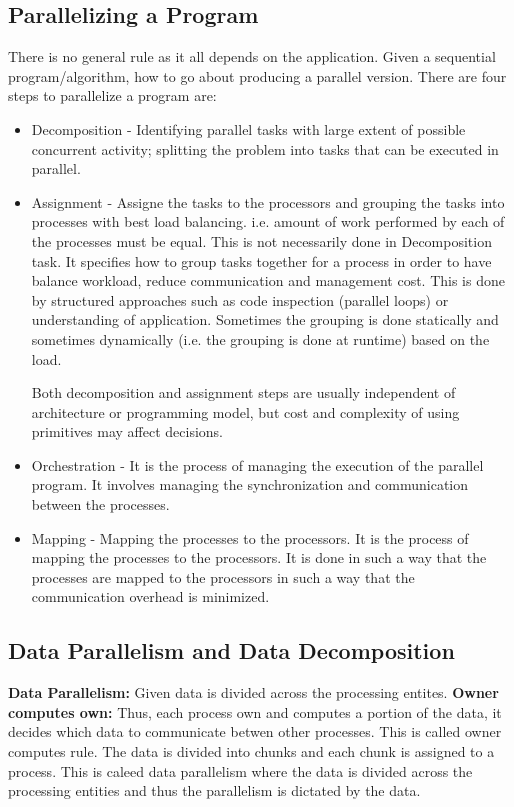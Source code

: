 \documentclass[12pt]{article}
\begin{document}
\subsection{Parallelizing a Program}
There is no general rule as it all depends on the application. Given a sequential program/algorithm, how to go about producing a parallel version. There are four steps to parallelize a program are:
\begin{itemize}
    \item Decomposition - Identifying parallel tasks with large extent of possible concurrent activity; splitting the problem into tasks that can be executed in parallel.
    \item Assignment - Assigne the tasks to the processors and grouping the tasks into processes with best load balancing. i.e. amount of work performed by each of the processes must be equal.
    This is not necessarily done in Decomposition task. It specifies how to group tasks together for a process in order to have balance workload, reduce communication and management cost.
    This is done by structured approaches such as code inspection (parallel loops) or understanding of application. Sometimes the grouping is done statically and sometimes dynamically (i.e. the grouping is done at runtime) based on the load.

    Both decomposition and assignment steps are usually independent of architecture or programming model, but cost and complexity of using primitives may affect decisions.
    \item Orchestration - It is the process of managing the execution of the parallel program. It involves managing the synchronization and communication between the processes. 
    \item Mapping - Mapping the processes to the processors. It is the process of mapping the processes to the processors. It is done in such a way that the processes are mapped to the processors in such a way that the communication overhead is minimized.
\end{itemize}
\subsection{Data Parallelism and Data Decomposition}
\textbf{Data Parallelism: }Given data is divided across the processing entites. \textbf{Owner computes own:} Thus, each process own and computes a portion of the data, it decides which data to communicate betwen other processes.
This is called owner computes rule. The data is divided into chunks and each chunk is assigned to a process. This is caleed data parallelism where the data is divided across the processing entities and thus the parallelism is dictated by the data. 
\end{document}
